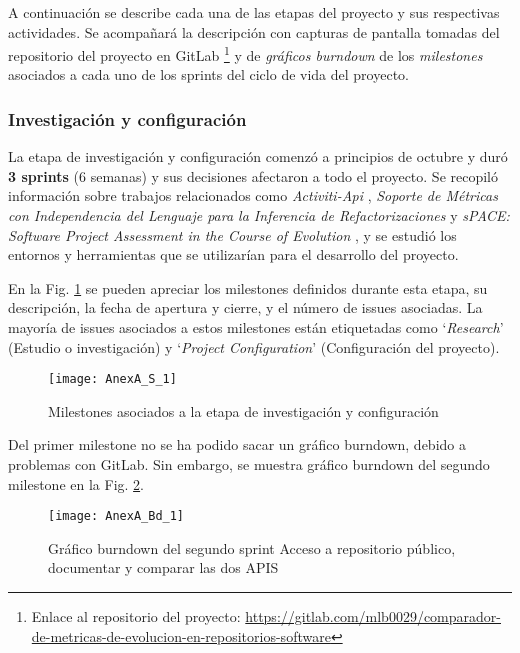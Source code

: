A continuación se describe cada una de las etapas del proyecto y sus respectivas actividades. Se acompañará la descripción con capturas de pantalla tomadas del repositorio del proyecto en GitLab \footnote{Enlace al repositorio del proyecto: \url{https://gitlab.com/mlb0029/comparador-de-metricas-de-evolucion-en-repositorios-software}} y de \textit{gráficos burndown} de los \textit{milestones} asociados a cada uno de los sprints del ciclo de vida del proyecto.

\subsubsection{Investigación y configuración}

La etapa de investigación y configuración comenzó a principios de octubre y duró \textbf{3 sprints} (6 semanas) y sus decisiones afectaron a todo el proyecto. Se recopiló información sobre trabajos relacionados como \textit{Activiti-Api} \cite{blanco_alonso_activiti-api_2016}, \textit{Soporte de Métricas con Independencia del Lenguaje para la Inferencia de Refactorizaciones}  \cite{marticorena_sanchez_soporte_2005} y \textit{sPACE: Software Project Assessment in the Course of Evolution} \cite{ratzinger_space:_2007}, y se estudió los entornos y herramientas que se utilizarían para el desarrollo del proyecto.

En la Fig. \ref{fig:AnexA_S_1} se pueden apreciar los milestones definidos durante esta etapa, su descripción, la fecha de apertura y cierre, y el número de issues asociadas. La mayoría de issues asociados a estos milestones están etiquetadas como `\textit{Research}' (Estudio o investigación) y `\textit{Project Configuration}' (Configuración del proyecto).

\begin{figure}[!h]
	\centering
	\texttt{[image: AnexA\_S\_1]}
	\caption{Milestones asociados a la etapa de investigación y configuración}
	\label{fig:AnexA_S_1}
\end{figure}
\FloatBarrier

Del primer milestone no se ha podido sacar un gráfico burndown, debido a problemas con GitLab. Sin embargo, se muestra gráfico burndown del segundo milestone en la Fig. \ref{fig:AnexA_Bd_1}.

\begin{figure}[!h]
	\centering
	\texttt{[image: AnexA\_Bd\_1]}
	\caption{Gráfico burndown del segundo sprint Acceso a repositorio público, documentar y comparar las dos APIS}
	\label{fig:AnexA_Bd_1}
\end{figure}
\FloatBarrier

